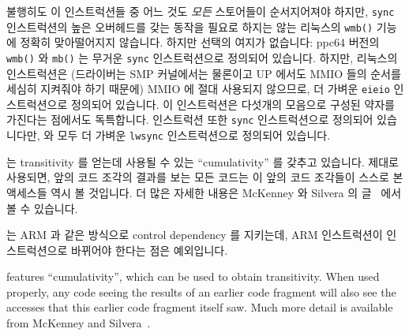 불행히도 이 인스트럭션들 중 어느 것도 {\em 모든} 스토어들이 순서지어져야
하지만, {\tt sync} 인스트럭션의 높은 오버헤드를 갖는 동작을 필요로 하지는 않는
리눅스의 {\tt wmb()} 기능에 정확히 맞아떨어지지 않습니다.
하지만 선택의 여지가 없습니다: ppc64 버전의 {\tt wmb()} 와 {\tt mb()} 는 무거운
{\tt sync} 인스트럭션으로 정의되어 있습니다.
하지만, 리눅스의  인스트럭션은 (드라이버는 SMP 커널에서는
물론이고 UP 에서도 MMIO 들의 순서를 세심히 지켜줘야 하기 때문에) MMIO 에 절대
사용되지 않으므로, 더 가벼운 {\tt eieio} 인스트럭션으로 정의되어 있습니다.
이 인스트럭션은 다섯개의 모음으로 구성된 약자를 가진다는 점에서도 독특합니다.
 인스트럭션 또한 {\tt sync} 인스트럭션으로 정의되어 있습니다만,
 와  모두 더 가벼운 {\tt lwsync} 인스트럭션으로
정의되어 있습니다.

\Power{} 는 transitivity 를 얻는데 사용될 수 있는 ``cumulativity'' 를 갖추고
있습니다.
제대로 사용되면, 앞의 코드 조각의 결과를 보는 모든 코드는 이 앞의 코드 조각들이
스스로 본 액세스들 역시 볼 것입니다.
더 많은 자세한 내용은 McKenney 와 Silvera 의 글~\cite{PaulEMcKenneyN2745r2009}
에서 볼 수 있습니다.

\Power{} 는 ARM 과 같은 방식으로 control dependency 를 지키는데, ARM 
인스트럭션이 \Power{}  인스트럭션으로 바뀌어야 한다는 점은
예외입니다.
\iffalse

\Power{} features ``cumulativity'', which can be used to obtain
transitivity.
When used properly, any code seeing the results of an earlier
code fragment will also see the accesses that this earlier code
fragment itself saw.
Much more detail is available from
McKenney and Silvera~\cite{PaulEMcKenneyN2745r2009}.


